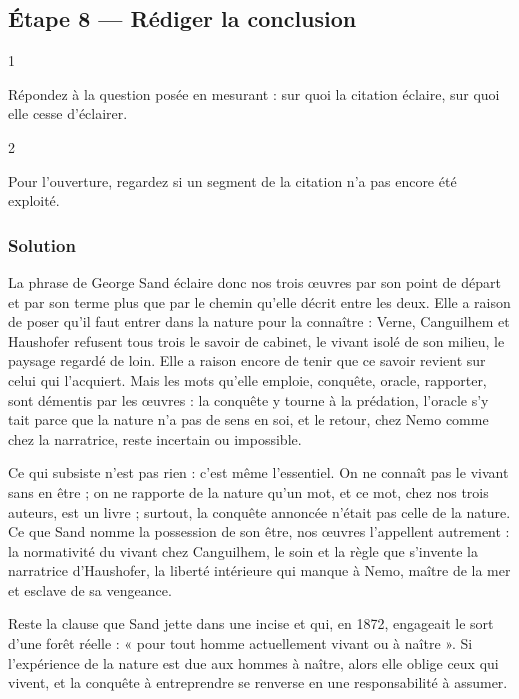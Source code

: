 \documentclass[11pt,a4paper]{article}
\begin{document}
\hypertarget{uxe9tape-8-ruxe9diger-la-conclusion}{%
\subsection{Étape 8 --- Rédiger la conclusion}\label{uxe9tape-8-ruxe9diger-la-conclusion}}

\begin{indication}{1}

Répondez à la question posée en mesurant : sur quoi la citation éclaire, sur quoi elle cesse d'éclairer.

\end{indication}

\begin{indication}{2}

Pour l'ouverture, regardez si un segment de la citation n'a pas encore été exploité.

\end{indication}

\hypertarget{solution-7}{%
\subsubsection{Solution}\label{solution-7}}

La phrase de George Sand éclaire donc nos trois œuvres par son point de départ et par son terme plus que par le chemin qu'elle décrit entre les deux. Elle a raison de poser qu'il faut entrer dans la nature pour la connaître : Verne, Canguilhem et Haushofer refusent tous trois le savoir de cabinet, le vivant isolé de son milieu, le paysage regardé de loin. Elle a raison encore de tenir que ce savoir revient sur celui qui l'acquiert. Mais les mots qu'elle emploie, conquête, oracle, rapporter, sont démentis par les œuvres : la conquête y tourne à la prédation, l'oracle s'y tait parce que la nature n'a pas de sens en soi, et le retour, chez Nemo comme chez la narratrice, reste incertain ou impossible.

Ce qui subsiste n'est pas rien : c'est même l'essentiel. On ne connaît pas le vivant sans en être ; on ne rapporte de la nature qu'un mot, et ce mot, chez nos trois auteurs, est un livre ; surtout, la conquête annoncée n'était pas celle de la nature. Ce que Sand nomme la possession de son être, nos œuvres l'appellent autrement : la normativité du vivant chez Canguilhem, le soin et la règle que s'invente la narratrice d'Haushofer, la liberté intérieure qui manque à Nemo, maître de la mer et esclave de sa vengeance.

Reste la clause que Sand jette dans une incise et qui, en 1872, engageait le sort d'une forêt réelle : « pour tout homme actuellement vivant ou à naître ». Si l'expérience de la nature est due aux hommes à naître, alors elle oblige ceux qui vivent, et la conquête à entreprendre se renverse en une responsabilité à assumer.
\end{document}

